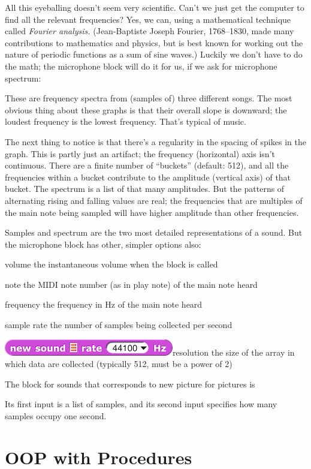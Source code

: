 All this eyeballing doesn't seem very scientific. Can't we just get the
computer to find all the relevant frequencies? Yes, we can, using a
mathematical technique called \emph{Fourier analysis.} (Jean-Baptiste
Joseph Fourier, 1768--1830, made many contributions to mathematics and
physics, but is best known for working out the nature of periodic
functions as a sum of sine waves.) Luckily we don't have to do the math;
the microphone block will do it for us, if we ask for microphone
spectrum:

These are frequency spectra from (samples of) three different songs. The
most obvious thing about these graphs is that their overall slope is
downward; the loudest frequency is the lowest frequency. That's typical
of music.

The next thing to notice is that there's a regularity in the spacing of
spikes in the graph. This is partly just an artifact; the frequency
(horizontal) axis isn't continuous. There are a finite number of
``buckets'' (default: 512), and all the frequencies within a bucket
contribute to the amplitude (vertical axis) of that bucket. The spectrum
is a list of that many amplitudes. But the patterns of alternating
rising and falling values are real; the frequencies that are multiples
of the main note being sampled will have higher amplitude than other
frequencies.

Samples and spectrum are the two most detailed representations of a
sound. But the microphone block has other, simpler options also:

volume the instantaneous volume when the block is called

note the MIDI note number (as in play note) of the main note heard

frequency the frequency in Hz of the main note heard

sample rate the number of samples being collected per second

\includegraphics[width=2.91667in,height=0.28125in]{media/image258.png}resolution
the size of the array in which data are collected (typically 512, must
be a power of 2)

The block for sounds that corresponds to new picture for pictures is

Its first input is a list of samples, and its second input specifies how
many samples occupy one second.

\section{\texorpdfstring{\hfill\break
OOP with Procedures}{ OOP with Procedures}}\label{oop-with-procedures}

